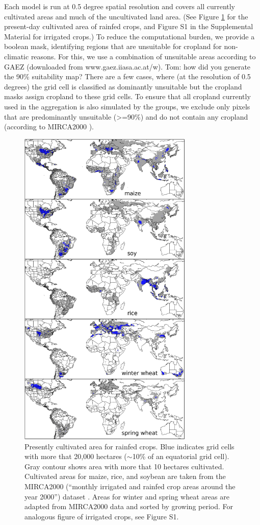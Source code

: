 \documentclass[gmd, manuscript]{copernicus} %
\begin{document}
Each model is run at 0.5 degree spatial resolution and covers all currently cultivated areas and much of the uncultivated land area. 
(See Figure \ref{fig:crop_area} for the present-day cultivated area of rainfed crops, and Figure S1 in the Supplemental Material for irrigated crops.)  
To reduce the computational burden, we provide a boolean mask, identifying regions that are unsuitable for cropland for non-climatic reasons. 
For this, we use a combination of unsuitable areas according to GAEZ (downloaded from www.gaez.iiasa.ac.at/w). 
{\color{red}Tom: how did you generate the 90\% suitability map?}
There are a few cases, where (at the resolution of 0.5 degrees) the grid cell is classified as dominantly unsuitable but the cropland masks assign cropland to these grid cells. 
To ensure that all cropland currently used in the aggregation is also simulated by the groups, we exclude only pixels that are predominantly unsuitable (>=90\%) and do not contain any cropland (according to MIRCA2000 \citep{Portmann2010}).

\begin{figure}[ht]
\centering
   \includegraphics[width=8.3cm]{figures/croparea.png}
   \caption{Presently cultivated area for rainfed crops. Blue indicates grid cells with more that 20,000 hectares ($\sim$10\% of an equatorial grid cell). 
   Gray contour shows area with more that 10 hectares cultivated. Cultivated areas for maize, rice, and soybean are taken from the MIRCA2000 (``monthly irrigated and rainfed crop areas around the year 2000'') dataset \citep{Portmann2010}. 
   Areas for winter and spring wheat areas are adapted from MIRCA2000 data and sorted by growing period. 
   For analogous figure of irrigated crops, see Figure S1.}
   \label{fig:crop_area}
\end{figure}
\end{document}
